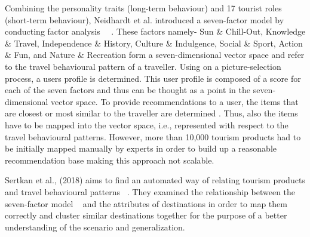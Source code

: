 Combining the personality traits (long-term behaviour) and 17 tourist roles (short-term behaviour), Neidhardt et al. introduced a seven-factor model by conducting factor analysis~\cite{neidhardt2015picture} ~\cite{neidhardt2014eliciting}. These factors namely- Sun \& Chill-Out, Knowledge \& Travel, Independence \& History, Culture \& Indulgence, Social \& Sport, Action \& Fun, and Nature \& Recreation form a seven-dimensional vector space and refer to the travel behavioural pattern of a traveller.  Using on a picture-selection process, a user\textquotesingle s profile is determined. This user profile is composed of a score for each of the seven factors and thus can be thought as a point in the seven-dimensional vector space. To provide recommendations to a user, the items that are closest or most similar to the traveller are determined . Thus, also the items have to be mapped into the vector space, i.e., represented with respect to the travel behavioural patterns. However, more than 10,000 tourism products had to be initially mapped manually by experts in order to build up a reasonable recommendation base making this approach not scalable.


Sertkan et al., (2018) aims to find an automated way of relating tourism products and travel behavioural patterns ~\cite{sertkan2018mapping}. They examined the relationship between the seven-factor model ~\cite{neidhardt2015picture, neidhardt2014eliciting}  and the attributes of destinations in order to map them correctly and cluster similar destinations together for the purpose of a better understanding of the scenario and generalization.



